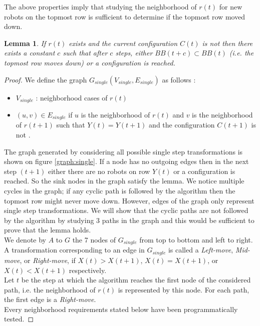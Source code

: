 \documentclass[11pt, a4paper]{article}
\theoremstyle{plain}
\newtheorem{lem}[thm]{Lemma}
\theoremstyle{definition}
\theoremstyle{remark}
\begin{document}
The above properties imply that studying the neighborhood of $r(t)$ for new
robots on the topmost row is sufficient to determine if the topmost row moved
down.

\begin{lem}
If $r(t)$ exists and the current configuration $C(t)$ is not  \Gathered then
there exists a constant $c$ such that after $c$ steps, either $BB(t+c) \subset
BB(t)$ (i.e. the topmost row moves down) or a \Gathered configuration is
reached.
\end{lem}

\begin{proof}

We define the graph $G_{single}(V_{single}, E_{single})$ as follows :
\begin{itemize}
  \item $V_{single}$ : neighborhood cases of $r(t)$
  \item $(u,v) \in E_{single}$ if $u$ is the neighborhood of $r(t)$ and $v$ is
        the neighborhood of $r(t+1)$ such that $Y(t)=Y(t+1)$ and the
        configuration $C(t+1)$ is not \Gathered.  \end{itemize}
The graph generated by considering all possible single step transformations is
shown on figure \ref{graph:single}. If a node has no outgoing edges then in the
next step $(t+1)$ either there are no robots on row $Y(t)$ or a \Gathered
configuration is reached. So the sink nodes in the graph satisfy the lemma.  We
notice multiple cycles in the graph; if any cyclic path is followed by the
algorithm then the topmost row might never move down. However, edges of the
graph only represent single step transformations. We will show that the cyclic
paths are not followed by the algorithm by studying 3 paths in the graph and
this would be sufficient to prove that the lemma holds. \\

\noindent
We denote by $A$ to $G$ the 7 nodes of $G_{single}$ from top to
bottom and left to right. \\ A transformation corresponding to an edge in
$G_{single}$ is called a \emph{Left-move}, \emph{Mid-move}, or
\emph{Right-move}, if  $X(t) > X(t+1)$, $X(t) = X(t+1)$, or $X(t) < X(t+1)$
respectively.\\
Let $t$ be the step at which the algorithm reaches the first node of the
considered path, i.e. the neighborhood of $r(t)$ is represented by this node.
For each path, the first edge is a \emph{Right-move}. \\
Every neighborhood requirements stated below have been programmatically tested.


\end{proof}
\end{document}
